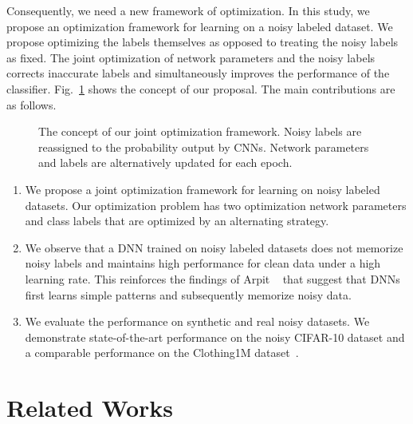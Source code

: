 \documentclass[10pt,twocolumn,letterpaper]{article}
\newcommand{\Fref}[1]{Fig.~\ref{#1}}
\begin{document}
Consequently, we need a new framework of optimization. In this study, we propose an optimization framework for learning on a noisy labeled dataset. We propose optimizing the labels themselves as opposed to treating the noisy labels as fixed. The joint optimization of network parameters and the noisy labels corrects inaccurate labels and simultaneously improves the performance of the classifier. \Fref{fig:gainen} shows the concept of our proposal. The main contributions are as follows.

\begin{figure}[t]
  \centering
  \caption{The concept of our joint optimization framework. Noisy labels are reassigned to the probability output by CNNs. Network parameters and labels are alternatively updated for each epoch.}
  \label{fig:gainen}
  \vspace{-5mm}
\end{figure}

\begin{enumerate}
	\item {We propose a joint optimization framework for learning on noisy labeled datasets. Our optimization problem has two optimization network parameters and class labels that are optimized by an alternating strategy.}
	\vspace{-2mm}
	\item{We observe that a DNN trained on noisy labeled datasets does not memorize noisy labels and maintains high performance for clean data under a high learning rate. This reinforces the findings of Arpit \etal~\cite{arpit2017closer} that suggest that DNNs first learns simple patterns and subsequently memorize noisy data.}
	\vspace{-2mm}
	\item{We evaluate the performance on synthetic and real noisy datasets. We demonstrate state-of-the-art performance on the noisy CIFAR-10 dataset and a comparable performance on the Clothing1M dataset~\cite{xiao2015learning}.}
\end{enumerate}

\section{Related Works}
\end{document}
